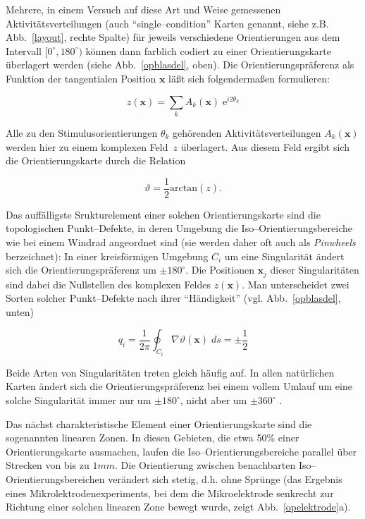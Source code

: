 Mehrere, in einem Versuch auf diese Art und Weise gemessenen
Aktivitätsverteilungen (auch ``single--condition'' Karten genannt, siehe
z.B. Abb.~\ref{layout}, rechte Spalte) für jeweils verschiedene
Orientierungen aus dem Intervall $[0^\circ,180^\circ)$ können dann
farblich codiert zu einer Orientierungskarte überlagert werden (siehe
Abb.~\ref{opblasdel}, oben).  Die Orientierungspräferenz als Funktion der
tangentialen Position $\mathbf{x}$ läßt sich folgendermaßen formulieren:

\begin{equation*}
z(\mathbf{x})=\sum\limits_k A_k(\mathbf{x})\; \text{e}^{i2\theta_k}
\label{zfeld}
\end{equation*}

Alle zu den Stimulusorientierungen $\theta_k$ gehörenden
Aktivitätsverteilungen $A_k(\mathbf{x})$ werden hier zu einem komplexen
Feld~$z$ überlagert.  Aus diesem Feld ergibt sich die Orientierungskarte
durch die Relation

\begin{equation*}
\vartheta=\frac{1}{2}\text{arctan}(z).
\end{equation*}

Das auffälligste Srukturelement einer solchen Orientierungskarte sind die
topologischen Punkt--Defekte, in deren Umgebung die
Iso--Orientierungsbereiche wie bei einem Windrad angeordnet sind (sie
werden daher oft auch als \emph{Pinwheels} berzeichnet): In einer
kreisförmigen Umgebung $C_i$ um eine Singularität ändert sich die
Orientierungspräferenz um $\pm 180^\circ$.  Die Positionen $\mathbf{x}_j$
dieser Singularitäten sind dabei die Nullstellen des komplexen Feldes
$z(\mathbf{x})$. Man unterscheidet zwei Sorten solcher Punkt--Defekte nach
ihrer ``Händigkeit'' (vgl. Abb.~\ref{opblasdel}, unten)

\begin{equation}
q_i=\frac{1}{2\pi}\oint_{C_i}\!\!\nabla\vartheta(\mathbf{x})\;ds = \pm
\frac{1}{2}
\label{chi}
\end{equation}

Beide Arten von Singularitäten treten gleich häufig auf.  In allen
natürlichen Karten ändert sich die Orientierungspräferenz bei einem
vollem Umlauf um eine solche Singularität immer nur um $\pm 180^\circ$,
nicht aber um $\pm 360^\circ$ .

Das nächst charakteristische Element einer Orientierungskarte sind die
sogenannten linearen Zonen. In diesen Gebieten, die etwa 50\% einer
Orientierungskarte ausmachen, laufen die Iso--Orientierungsbereiche
parallel über Strecken von bis zu $1mm$. Die Orientierung zwischen
benachbarten Iso--Orientierungsbereichen verändert sich stetig, d.h. ohne
Sprünge (das Ergebnis eines Mikrolektrodenexperiments, bei dem die
Mikroelektrode senkrecht zur Richtung einer solchen linearen Zone bewegt
wurde, zeigt Abb.~\ref{opelektrode}a).

